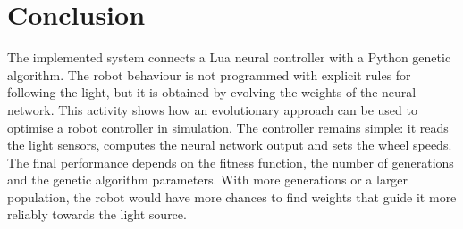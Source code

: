 \documentclass[a4paper,12pt]{report}
\begin{document}
\section{Conclusion}

The implemented system connects a Lua neural controller with a Python genetic algorithm. The robot behaviour is not programmed with explicit rules for following the light, but it is obtained by evolving the weights of the neural network.
\newline
This activity shows how an evolutionary approach can be used to optimise a robot controller in simulation. The controller remains simple: it reads the light sensors, computes the neural network output and sets the wheel speeds. The final performance depends on the fitness function, the number of generations and the genetic algorithm parameters. With more generations or a larger population, the robot would have more chances to find weights that guide it more reliably towards the light source.
\end{document}
